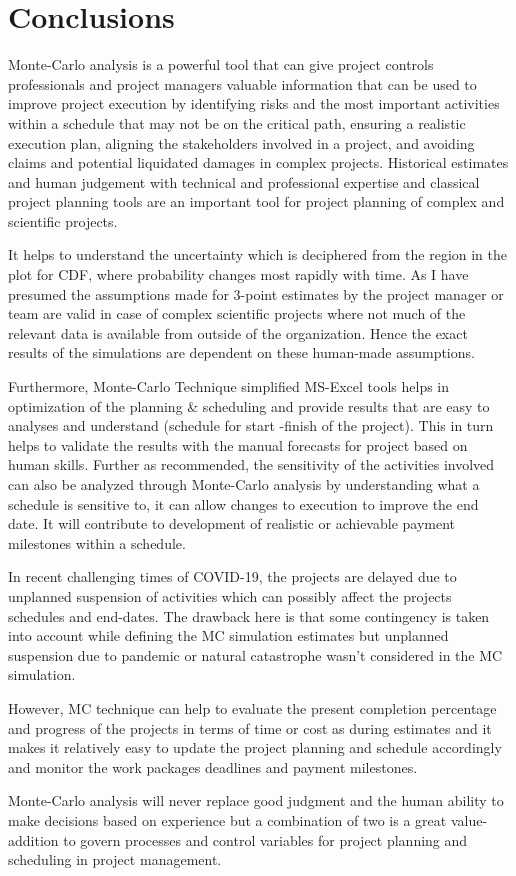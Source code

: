 \let\textcircled=\pgftextcircled
\chapter{Conclusions}
\label{chap:annex}
Monte-Carlo analysis is a powerful tool that can give project controls professionals and project managers valuable information that can be used to improve project execution by identifying risks and the most important activities within a schedule that may not be on the critical path, ensuring a realistic execution plan, aligning the stakeholders involved in a project, and avoiding claims and potential liquidated damages in complex projects. Historical estimates and human judgement with technical and professional expertise and classical project planning tools are an important tool for project planning of complex and scientific projects.

It helps to understand the uncertainty which is deciphered from the region in the plot for CDF, where probability changes most rapidly with time. As I have presumed the assumptions made for 3-point estimates by the project manager or team are valid in case of complex scientific projects where not much of the relevant data is available from outside of the organization. Hence the exact results of the simulations are dependent on these human-made assumptions.

Furthermore, Monte-Carlo Technique simplified MS-Excel tools helps in optimization of the planning \& scheduling and provide results that are easy to analyses and understand (schedule for start -finish of the project). This in turn helps to validate the results with the manual forecasts for project based on human skills. Further as recommended, the sensitivity of the activities involved can also be analyzed through Monte-Carlo analysis by understanding what a schedule is sensitive to, it can allow changes to execution to improve the end date. It will contribute to development of realistic or achievable payment milestones within a schedule. 

In recent challenging times of COVID-19, the projects are delayed due to unplanned suspension of activities which can possibly affect the projects schedules and end-dates. The drawback here is that some contingency is taken into account while defining the MC simulation estimates but unplanned suspension due to pandemic or natural catastrophe wasn't considered in the MC simulation.

However, MC technique can help to evaluate the present completion percentage and progress of the projects in terms of time or cost as during estimates and it makes it relatively easy to update the project planning and schedule accordingly and monitor the work packages deadlines and payment milestones. 

Monte-Carlo analysis will never replace good judgment and the human ability to make decisions based on experience but a combination of two is a great value-addition to govern processes and control variables for project planning and scheduling in project management.
